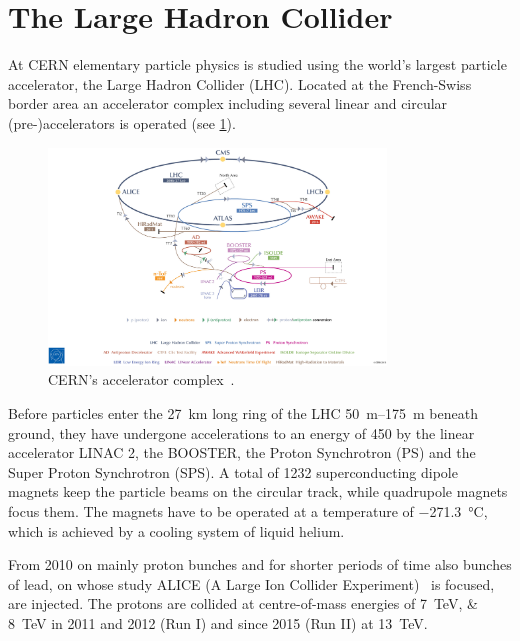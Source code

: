 
\section{The Large Hadron Collider}
\label{sec:detector:lhc}

At CERN elementary particle physics is studied using the world's largest
particle accelerator, the Large Hadron Collider (LHC). Located at the
French-Swiss border area an accelerator complex including several linear and
circular (pre-)accelerators is operated (see
\cref{fig:detector:accelerators}).
\begin{figure}
\centering
\includegraphics[width=0.8\textwidth]{04-Detector/figs/CERN_complex.pdf}
\caption{CERN's accelerator complex~\cite{Marcastel:1621583}.}
\label{fig:detector:accelerators}
\end{figure}
Before particles enter the \SI{27}{\kilo\metre} long ring of the LHC
\SIrange[range-phrase={\,to\,}]{50}{175}{m} beneath ground, they have undergone
accelerations to an energy of \SI{450}{\gev} by the linear accelerator LINAC
2, the BOOSTER, the Proton Synchrotron (PS) and the Super Proton Synchrotron
(SPS). A total of 1232 superconducting dipole magnets keep the particle beams
on the circular track, while quadrupole magnets focus them. The magnets have
to be operated at a temperature of
\SI{-271.3}{\celsius}, which is achieved by a cooling system of liquid
helium.

From 2010 on mainly proton bunches and for shorter periods of time also
bunches of lead, on whose study ALICE (A Large Ion Collider
Experiment)~\cite{ALICE} is focused, are injected. The protons are collided at
centre-of-mass energies of \SIlist{7;8}{\TeV} in 2011 and 2012 (Run I) and
since 2015 (Run II) at \SI{13}{\TeV}.